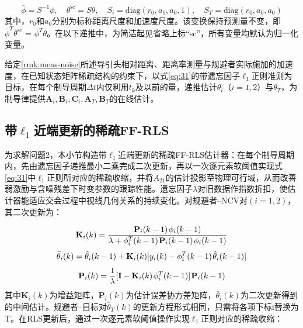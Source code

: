 \begin{equation}
\label{eq:32}
\bar{\phi} = {S^{ - 1}}\phi ,\quad {\theta ^{{\text{sc}}}} = S\theta ,\quad {S_i} = {\text{diag}}({r_0},{a_0},{a_0},1),\quad {S_T} = {\text{diag}}({r_0},{a_0},{a_0})
\end{equation}
其中，${r_0}$和${a_0}$分别为标称距离尺度和加速度尺度。该变换保持预测量不变，即$\bar{\phi}^{T}{\theta ^{{\text{sc}}}}{\text{ = }}{\phi ^T}\theta $。在以下递推中，为简洁起见省略上标“sc”，所有变量均默认为归一化变量。

\begin{problem}[结构稀疏参数辨识]
给定\cref{rmk:meas-noise}所述导引头相对距离、距离率测量与规避者实际施加的加速度，在已知状态矩阵稀疏结构的约束下，以式\eqref{eq:31}的带遗忘因子${\ell _1}$正则准则为目标，在每个制导周期$\Delta t$内仅利用${t_k}$及以前的量，递推估计${\theta _i}$（$i = 1,2$）与${\theta _T}$，为制导律提供${{\mathbf{A}}_i},{{\mathbf{B}}_i},{{\mathbf{C}}_i},{{\mathbf{A}}_T},{{\mathbf{B}}_T}$的在线估计。
\end{problem}
\subsection{带${\ell _1}$近端更新的稀疏FF-RLS}
为求解问题2，本小节构造带${\ell _1}$近端更新的稀疏FF-RLS估计器：在每个制导周期内，先由遗忘因子递推最小二乘完成二次更新，再以一次逐元素软阈值实现式\eqref{eq:31}中${\ell _1}$正则所对应的稀疏收缩，并将${A_{21}}$的估计投影至物理可行域，从而改善弱激励与含噪残差下时变参数的跟踪性能。遗忘因子$\lambda$对旧数据作指数折扣，使估计器能适应交会过程中视线几何关系的持续变化。对规避者–NCV对$(i = 1,2)$，其二次更新为：

\begin{equation}
\label{eq:33}
{{\mathbf{K}}_i}(k) = \frac{{{{\mathbf{P}}_i}(k - 1){\kern 1pt} {\phi _i}(k - 1)}}{{\lambda  + \phi _i^T(k - 1){\kern 1pt} {{\mathbf{P}}_i}(k - 1){\kern 1pt} {\phi _i}(k - 1)}}
\end{equation}
\begin{equation}
\label{eq:34}
\bar{\theta}_{i}(k) = \hat{\theta}_{i}(k - 1) + {{\mathbf{K}}_i}(k)[{y_i}(k) - \phi _i^T(k - 1){\kern 1pt} \hat{\theta}_{i}(k - 1)]
\end{equation}
\begin{equation}
\label{eq:35}
{{\mathbf{P}}_i}(k) = \frac{1}{\lambda }[{\mathbf{I}} - {{\mathbf{K}}_i}(k){\kern 1pt} \phi _i^T(k - 1)]{\kern 1pt} {{\mathbf{P}}_i}(k - 1)
\end{equation}
其中${{\mathbf{K}}_i}(k)$为增益矩阵，${{\mathbf{P}}_i}(k)$为估计误差协方差矩阵，$\bar{\theta}_{i}(k)$为二次更新得到的中间估计。规避者–目标对$\bar{\theta}_{T}(k)$的更新方程形式相同，只需将各项下标i替换为T。在RLS更新后，通过一次逐元素软阈值操作实现${\ell _1}$正则对应的稀疏收缩：

